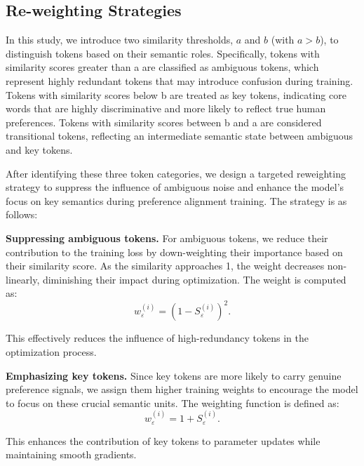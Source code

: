 \subsection{Re-weighting Strategies}
\label{subsec:re_weighting_strategies}
In this study, we introduce two similarity thresholds, $a$ and $b$ (with $a > b$), to distinguish tokens based on their semantic roles. Specifically, tokens with similarity scores greater than a are classified as ambiguous tokens, which represent highly redundant tokens that may introduce confusion during training. Tokens with similarity scores below b are treated as key tokens, indicating core words that are highly discriminative and more likely to reflect true human preferences. Tokens with similarity scores between b and a are considered transitional tokens, reflecting an intermediate semantic state between ambiguous and key tokens.

After identifying these three token categories, we design a targeted reweighting strategy to suppress the influence of ambiguous noise and enhance the model’s focus on key semantics during preference alignment training. The strategy is as follows:


\textbf{Suppressing ambiguous tokens.}
For ambiguous tokens, we reduce their contribution to the training loss by down-weighting their importance based on their similarity score. As the similarity approaches 1, the weight decreases non-linearly, diminishing their impact during optimization. The weight is computed as:
\begin{equation}
   w_{\varepsilon}^{(i)} = (1 - S_\varepsilon^{(i)})^2.
\end{equation}

This effectively reduces the influence of high-redundancy tokens in the optimization process.

\textbf{Emphasizing key tokens.}
Since key tokens are more likely to carry genuine preference signals, we assign them higher training weights to encourage the model to focus on these crucial semantic units. The weighting function is defined as:
\begin{equation}
  w_{\varepsilon}^{(i)} = 1 + S_\varepsilon^{(i)}.
\end{equation}

This enhances the contribution of key tokens to parameter updates while maintaining smooth gradients.

